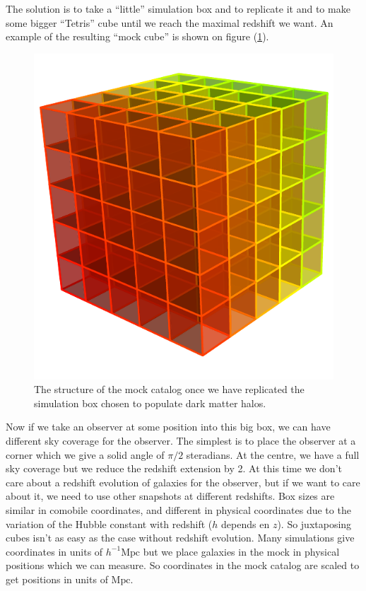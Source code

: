 The solution is to take a ``little'' simulation box and to replicate it and to
make some bigger ``Tetris'' cube until we reach the maximal redshift we want.
An example of the resulting ``mock cube'' is shown on figure
(\ref{fig:cubemock}).
%
\begin{figure}
    \centering
    \includegraphics[width=\linewidth]{figures/mock/mock}
    \caption{The structure of the mock catalog once we have replicated the
    simulation box chosen to populate dark matter halos.}%
\label{fig:cubemock}
\end{figure}

Now if we take an observer at some position into this big box, we can have
different sky coverage for the observer. The simplest is to place the observer
at a corner which we give a solid angle of $\pi/2$ steradians. At the centre,
we have a full sky coverage but we reduce the redshift extension by 2.
%
At this time we don't care about a redshift evolution of galaxies for the
observer, but if we want to care about it, we need to use other snapshots at
different redshifts. Box sizes are similar in comobile coordinates, and
different in physical coordinates due to the variation of the Hubble constant
with redshift ($h$ depends en $z$). So juxtaposing cubes isn't as easy as the
case without redshift evolution.
%
Many simulations give coordinates in units of $h^{-1}\mathrm{Mpc}$ but we place
galaxies in the mock in physical positions which we can measure. So coordinates
in the mock catalog are scaled to get positions in units of $\mathrm{Mpc}$.


